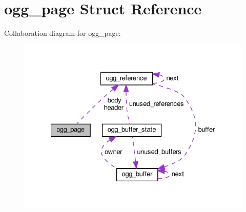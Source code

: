 \hypertarget{structogg__page}{}\section{ogg\+\_\+page Struct Reference}
\label{structogg__page}


Collaboration diagram for ogg\+\_\+page\+:
\nopagebreak
\begin{figure}[H]
\begin{center}
\leavevmode
\includegraphics[width=327pt]{structogg__page__coll__graph}
\end{center}
\end{figure}
